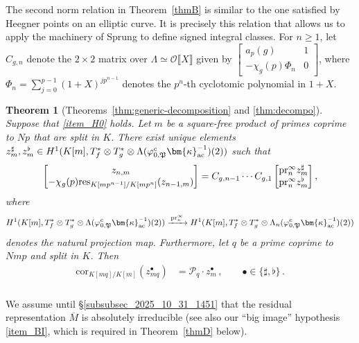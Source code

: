 \documentclass{amsart}
\numberwithin{equation}{section}
\newtheorem{lthm}{Theorem}
\newcommand{\frk}{\mathfrak}
\newcommand{\pr}{\mathrm{pr}}
\newcommand{\cO}{\mathcal{O}}
\newcommand{\ac}{\textup{ac}}
\newcommand{\res}{\textup{res}}
\newcommand{\cP}{\mathcal{P}}
\begin{document}
\subsubsection{} The second norm relation in Theorem~\ref{thmB} is similar to the one satisfied by Heegner points on an elliptic curve. It is precisely this relation that allows us to apply the machinery of Sprung to define signed integral classes.  For $n\ge1$, let $C_{g,n}$ denote the $2\times2$ matrix over $\Lambda\simeq\cO\llbracket X\rrbracket$ given by
$\begin{bmatrix}
    a_p(g)&1\\ -\chi_g(p)\Phi_n&0
    \end{bmatrix}$, where $\Phi_n=\sum_{j=0}^{p-1}(1+X)^{jp^{n-1}}$ denotes the $p^n$-th cyclotomic polynomial in $1+X$. 
\begin{lthm}[Theorems~\ref{thm:generic-decomposition} and \ref{thm:decompo}]\label{thmC}
     Suppose that \eqref{item_H0}  holds. Let $m$ be a square-free product of primes coprime to $Np$ that are split in $K$. There exist unique elements $z_m^\sharp,z_m^\flat\in H^1(K[m],T_f^\ast\otimes T_g^\ast\otimes \Lambda(\varphi_{0,\frk{P}}^c\bm{\kappa}_{\ac}^{-1})(2))$ such that
     \[
    \begin{bmatrix}
        z_{n,m}\\-\chi_g(p)\res_{K[mp^{n-1}]/K[mp^n]}(z_{n-1,m})
    \end{bmatrix}
    =C_{g,n-1}\cdots C_{g,1}\begin{bmatrix}
        \pr^\infty_n z_m^\sharp\\\pr^\infty_n z_m^\flat
    \end{bmatrix},
    \]
    where  
    $$H^1(K[m],T_f^\ast\otimes T_g^\ast\otimes \Lambda(\varphi_{0,\frk{P}}^c\bm{\kappa}_{\ac}^{-1})(2))\xrightarrow{\,\pr^\infty_n\,} H^1(K[m],T_f^\ast\otimes T_g^\ast\otimes \Lambda_n(\varphi_{0,\frk{P}}^c\bm{\kappa}_{\ac}^{-1})(2))$$ 
    denotes the natural projection map.
    Furthermore,  let $q$ be a prime coprime to $Nmp$ and split in $K$. Then
    \begin{align*}
        \mathrm{cor}_{K[mq]/K[m]}\left(z_{m q}^\bullet\right) &= \cP_q\cdot z_{m}^\bullet\,,\qquad \bullet\in\{\sharp,\flat\}\,.
    \end{align*}
\end{lthm}

\subsubsection{} 
\label{subsubsection_125_2025_11_02}
 We assume until \S\ref{subsubsec_2025_10_31_1451} that the residual representation $\overline{M}$ is absolutely irreducible (see also our ``big image'' hypothesis \eqref{item_BI}, which is required in Theorem~\ref{thmD} below).
\end{document}
